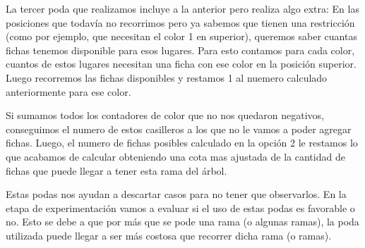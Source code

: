 La tercer poda que realizamos incluye a la anterior pero realiza algo extra: En las posiciones que todavía no recorrimos pero ya sabemos que tienen una restricción (como por ejemplo, que necesitan el color 1 en superior), queremos saber cuantas fichas tenemos disponible para esos lugares. Para esto contamos para cada color, cuantos de estos lugares necesitan una ficha con ese color en la posición superior. Luego recorremos las fichas disponibles y restamos 1 al nuemero calculado anteriormente para ese color.

Si sumamos todos los contadores de color que no nos quedaron negativos, conseguimos el numero de estos casilleros a los que no le vamos a poder agregar fichas. Luego, el numero de fichas posibles calculado en la opción 2 le restamos lo que acabamos de calcular obteniendo una cota mas ajustada de la cantidad de fichas que puede llegar a tener esta rama del árbol.

Estas podas nos ayudan a descartar casos para no tener que observarlos. En la etapa de experimentación vamos a evaluar si el uso de estas podas es favorable o no. Esto se debe a que por más que se pode una rama (o algunas ramas), la poda utilizada puede llegar a ser más costosa que recorrer dicha rama (o ramas).